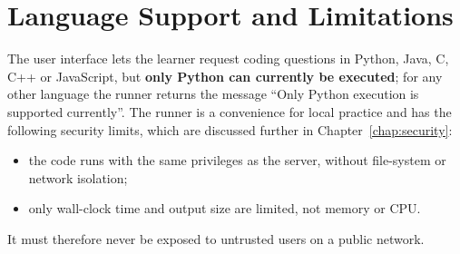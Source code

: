 \section{Language Support and Limitations}
The user interface lets the learner request coding questions in Python, Java, C, C++ or JavaScript, but \textbf{only Python can currently be executed}; for any other language the runner returns the message ``Only Python execution is supported currently''. The runner is a convenience for local practice and has the following security limits, which are discussed further in Chapter~\ref{chap:security}:
\begin{itemize}
\item the code runs with the same privileges as the server, without file-system or network isolation;
\item only wall-clock time and output size are limited, not memory or CPU.
\end{itemize}
It must therefore never be exposed to untrusted users on a public network.

